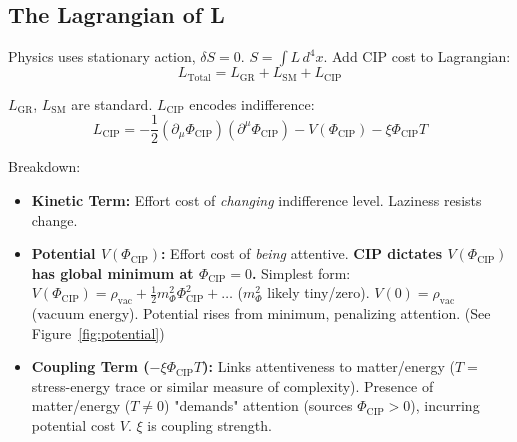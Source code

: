 \documentclass[11pt, a4paper]{article}
\newcommand{\subt}[1]{\mathrm{#1}}
\begin{document}
\subsection{The Lagrangian of L}

Physics uses stationary action, $\delta S = 0$. $S = \int L \, d^4x$. Add CIP cost to Lagrangian:
\begin{equation} \label{eq:lagrangian_total}
L_{\subt{Total}} = L_{\subt{GR}} + L_{\subt{SM}} + L_{\subt{CIP}}
\end{equation}

$L_{\subt{GR}}$, $L_{\subt{SM}}$ are standard. $L_{\subt{CIP}}$ encodes indifference:
\begin{equation} \label{eq:lagrangian_cip}
L_{\subt{CIP}} = - \frac{1}{2} (\partial_{\mu}\Phi_{\subt{CIP}})(\partial^{\mu}\Phi_{\subt{CIP}}) - V(\Phi_{\subt{CIP}}) - \xi \Phi_{\subt{CIP}} T
\end{equation}

Breakdown:
\begin{itemize}
    \item \textbf{Kinetic Term:} Effort cost of \textit{changing} indifference level. Laziness resists change.
    \item \textbf{Potential $V(\Phi_{\subt{CIP}})$:} Effort cost of \textit{being} attentive. \textbf{CIP dictates $V(\Phi_{\subt{CIP}})$ has global minimum at $\Phi_{\subt{CIP}} = 0$.} Simplest form: $V(\Phi_{\subt{CIP}}) = \rho_{\subt{vac}} + \frac{1}{2} m_{\Phi}^2 \Phi_{\subt{CIP}}^2 + \dots$ ($m_{\Phi}^2$ likely tiny/zero). $V(0) = \rho_{\subt{vac}}$ (vacuum energy). Potential rises from minimum, penalizing attention. (See Figure~\ref{fig:potential})
    \item \textbf{Coupling Term ($- \xi \Phi_{\subt{CIP}} T$):} Links attentiveness to matter/energy ($T = $ stress-energy trace or similar measure of complexity). Presence of matter/energy ($T \neq 0$) "demands" attention (sources $\Phi_{\subt{CIP}} > 0$), incurring potential cost $V$. $\xi$ is coupling strength.
\end{itemize}
\end{document}

